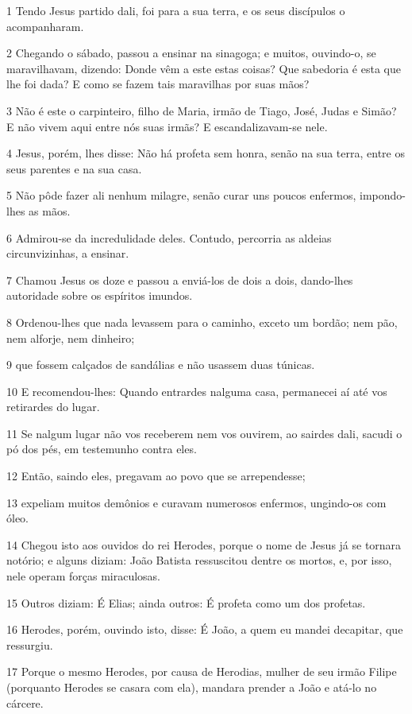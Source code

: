 \par 1 Tendo Jesus partido dali, foi para a sua terra, e os seus discípulos o acompanharam.
\par 2 Chegando o sábado, passou a ensinar na sinagoga; e muitos, ouvindo-o, se maravilhavam, dizendo: Donde vêm a este estas coisas? Que sabedoria é esta que lhe foi dada? E como se fazem tais maravilhas por suas mãos?
\par 3 Não é este o carpinteiro, filho de Maria, irmão de Tiago, José, Judas e Simão? E não vivem aqui entre nós suas irmãs? E escandalizavam-se nele.
\par 4 Jesus, porém, lhes disse: Não há profeta sem honra, senão na sua terra, entre os seus parentes e na sua casa.
\par 5 Não pôde fazer ali nenhum milagre, senão curar uns poucos enfermos, impondo-lhes as mãos.
\par 6 Admirou-se da incredulidade deles. Contudo, percorria as aldeias circunvizinhas, a ensinar.
\par 7 Chamou Jesus os doze e passou a enviá-los de dois a dois, dando-lhes autoridade sobre os espíritos imundos.
\par 8 Ordenou-lhes que nada levassem para o caminho, exceto um bordão; nem pão, nem alforje, nem dinheiro;
\par 9 que fossem calçados de sandálias e não usassem duas túnicas.
\par 10 E recomendou-lhes: Quando entrardes nalguma casa, permanecei aí até vos retirardes do lugar.
\par 11 Se nalgum lugar não vos receberem nem vos ouvirem, ao sairdes dali, sacudi o pó dos pés, em testemunho contra eles.
\par 12 Então, saindo eles, pregavam ao povo que se arrependesse;
\par 13 expeliam muitos demônios e curavam numerosos enfermos, ungindo-os com óleo.
\par 14 Chegou isto aos ouvidos do rei Herodes, porque o nome de Jesus já se tornara notório; e alguns diziam: João Batista ressuscitou dentre os mortos, e, por isso, nele operam forças miraculosas.
\par 15 Outros diziam: É Elias; ainda outros: É profeta como um dos profetas.
\par 16 Herodes, porém, ouvindo isto, disse: É João, a quem eu mandei decapitar, que ressurgiu.
\par 17 Porque o mesmo Herodes, por causa de Herodias, mulher de seu irmão Filipe (porquanto Herodes se casara com ela), mandara prender a João e atá-lo no cárcere.
